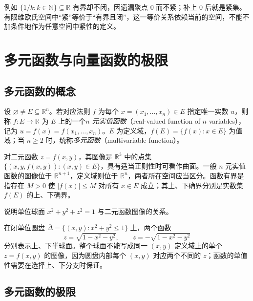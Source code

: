 \documentclass[UTF8,12pt,a4paper,fontset=fandol]{ctexbook}
\begin{document}
例如 $\{1/k:k\in\mathbb N\}\subseteq\mathbb R$ 有界却不闭，因遗漏聚点 $0$ 而不紧；补上 $0$ 后就是紧集。有限维欧氏空间中“紧”等价于“有界且闭”，这一等价关系依赖当前的空间，不能不加条件地作为任意空间中紧性的定义。

\section{多元函数与向量函数的极限}
\label{sec:limits-of-multivariable-and-vector-functions}

\subsection{多元函数的概念}
\label{subsec:concept-of-multivariable-functions}

\begin{definition}
\label{def:multivariable-real-valued-function}
设 $\varnothing\neq E\subseteq\mathbb R^n$。若对应法则 $f$ 为每个 $x=(x_1,\ldots,x_n)\in E$ 指定唯一实数 $u$，则称 $f:E\to\mathbb R$ 为 $E$ 上的一个\emph{$n$ 元实值函数}（real-valued function of $n$ variables），记为 $u=f(x)=f(x_1,\ldots,x_n)$。$E$ 为定义域，$f(E)=\{f(x):x\in E\}$ 为值域；当 $n\geq2$ 时，统称\emph{多元函数}（multivariable function）。
\end{definition}

对二元函数 $z=f(x,y)$，其图像是 $\mathbb R^3$ 中的点集 $\{(x,y,f(x,y)):(x,y)\in E\}$，具有适当正则性时可看作曲面。一般 $n$ 元实值函数的图像位于 $\mathbb R^{n+1}$，定义域则位于 $\mathbb R^n$，两者所在空间应当区分。函数有界是指存在 $M>0$ 使 $|f(x)|\leq M$ 对所有 $x\in E$ 成立；其上、下确界分别是实数集 $f(E)$ 的上、下确界。

\begin{example}
\label{ex:sphere-two-hemisphere-graphs}
说明单位球面 $x^2+y^2+z^2=1$ 与二元函数图像的关系。
\end{example}

\begin{solve}
在闭单位圆盘 $\overline\Delta=\{(x,y):x^2+y^2\leq1\}$ 上，两个函数
\[
    z=\sqrt{1-x^2-y^2},\qquad z=-\sqrt{1-x^2-y^2}
\]
分别表示上、下半球面。整个球面不能写成同一 $(x,y)$ 定义域上的单个 $z=f(x,y)$ 的图像，因为圆盘内部每个 $(x,y)$ 对应两个不同的 $z$；函数的单值性需要在选择上、下分支时保证。
\end{solve}

\subsection{多元函数的极限}
\label{subsec:limits-of-multivariable-functions}
\end{document}

